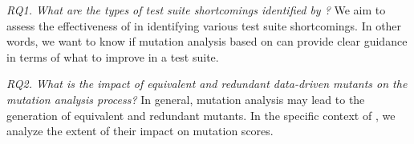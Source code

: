 %
%
%
%
%
%


\emph{RQ1. What are the types of test suite shortcomings identified by \APPR?}
    We aim to assess the effectiveness of \APPR in identifying various test suite shortcomings.  In other words, we want to know if mutation analysis based on \APPR can provide clear guidance in terms of what to improve in a test suite.






\emph{RQ2.
What is the impact of equivalent and redundant data-driven mutants on the mutation analysis process?}
    In general, mutation analysis may lead to the generation of equivalent and redundant mutants.
    In the specific context of \APPR, we analyze the extent of their impact on mutation scores.

